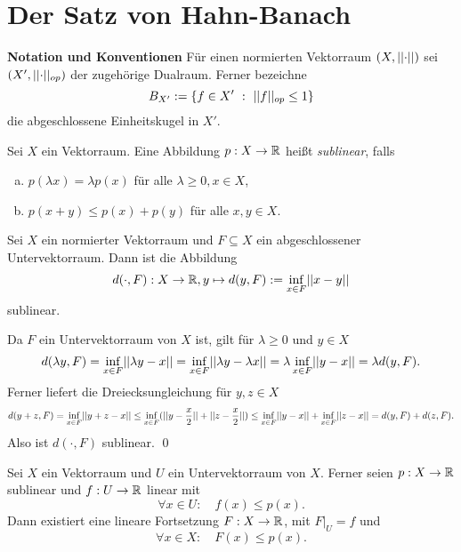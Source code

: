 \section{Der Satz von Hahn-Banach}
\textbf{Notation und Konventionen}\newline
Für einen normierten Vektorraum $(X, \lvert\lvert \cdot \rvert\rvert)$ sei $(X', \lvert\lvert \cdot \rvert\rvert_{op})$ der zugehörige Dualraum. Ferner bezeichne
$$
    B_{X'} := \{f \in X' \ : \ \lvert\lvert f \rvert\rvert_{op} \leq 1 \}
$$
die abgeschlossene Einheitskugel in $X'$. 

\begin{mydef}
    Sei $X$ ein Vektorraum. Eine Abbildung $p:X \to \mathbb{R}$ heißt \textit{sublinear}, falls
    \begin{enumerate}[(a)]
        \item $p(\lambda x) = \lambda p(x)$ für alle $\lambda \geq 0, x \in X$,
        \item $p(x+y) \leq p(x) + p(y)$ für alle $x,y \in X$. 
    \end{enumerate}
\end{mydef}

\begin{proposition}
    Sei $X$ ein normierter Vektorraum und $F \subseteq X$ ein abgeschlossener Untervektorraum. Dann ist die Abbildung
    $$
        d(\cdot, F):X \to \mathbb{R}, y \mapsto d(y,F) := \inf_{x \in F}\lvert\lvert x-y \rvert\rvert
    $$
    sublinear. 
\end{proposition}

\begin{proof*}
    Da $F$ ein Untervektorraum von $X$ ist, gilt für $\lambda \geq 0$ und $y \in X$ 
    $$
        d(\lambda y, F) = \inf_{x \in F}\lvert\lvert \lambda y - x \rvert\rvert = \inf_{x \in F}\lvert\lvert \lambda y - \lambda x \rvert\rvert = \lambda \inf_{x \in F}\lvert\lvert y-x \rvert\rvert = \lambda d(y,F). 
    $$
    Ferner liefert die Dreiecksungleichung für $y,z \in X$
    $$
        d(y+z,F) = \inf_{x \in F}\lvert\lvert y+z - x \rvert\rvert \leq \inf_{x \in F}(\lvert\lvert y - \frac{x}{2} \rvert\rvert + \lvert\lvert z - \frac{x}{2} \rvert\rvert) \leq \inf_{x \in F}\lvert\lvert y-x \rvert\rvert + \inf_{x \in F}\lvert\lvert z-x \rvert\rvert = d(y,F) + d(z,F). 
    $$
    Also ist $d(\cdot, F)$ sublinear. \qed 
\end{proof*}

\begin{theorem}
    Sei $X$ ein Vektorraum und $U$ ein Untervektorraum von $X$. Ferner seien $p: X \to \mathbb{R}$ sublinear und $f: U \to \mathbb{R}$ linear mit 
    $$
       \forall x \in U: \quad f(x) \leq p(x).
    $$
    Dann existiert eine lineare Fortsetzung $F:X \to \mathbb{R}$, mit $F|_U = f$ und
    $$
    \forall x \in X: \quad F(x) \leq p(x). 
    $$ 
\end{theorem}

